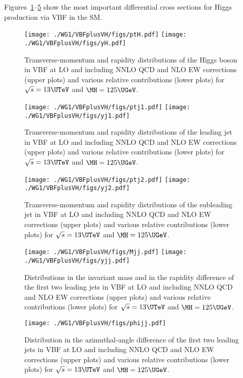 Figures~\ref{fig:SM-VBF-ptH-yH}--\ref{fig:SM-VBF-phijj} show the most important
differential cross sections for Higgs production via VBF in the SM.
%
\begin{figure}
\texttt{[image: ./WG1/VBFplusVH/figs/ptH.pdf]}
\hfill
\texttt{[image: ./WG1/VBFplusVH/figs/yH.pdf]}
\caption{Transverse-momentum and rapidity distributions of the Higgs boson in VBF
at LO and including NNLO QCD and NLO EW corrections (upper plots)
and various relative contributions (lower plots) for $\sqrt{s}=13\UTeV$ and $\MH=125\UGeV$.}
\label{fig:SM-VBF-ptH-yH}
\end{figure}
%
\begin{figure}
\texttt{[image: ./WG1/VBFplusVH/figs/ptj1.pdf]}
\hfill
\texttt{[image: ./WG1/VBFplusVH/figs/yj1.pdf]}
\caption{Transverse-momentum and rapidity distributions of the leading jet in VBF
at LO and including NNLO QCD and NLO EW corrections (upper plots)
and various relative contributions (lower plots) for $\sqrt{s}=13\UTeV$ and $\MH=125\UGeV$.}
\label{fig:SM-VBF-ptj1-yj1}
\end{figure}
%
\begin{figure}
\texttt{[image: ./WG1/VBFplusVH/figs/ptj2.pdf]}
\hfill
\texttt{[image: ./WG1/VBFplusVH/figs/yj2.pdf]}
\caption{Transverse-momentum and rapidity distributions of the subleading jet in VBF
at LO and including NNLO QCD and NLO EW corrections (upper plots)
and various relative contributions (lower plots) for $\sqrt{s}=13\UTeV$ and $\MH=125\UGeV$.}
\label{fig:SM-VBF-ptj2-yj2}
\end{figure}
%
\begin{figure}
\texttt{[image: ./WG1/VBFplusVH/figs/Mjj.pdf]}
\hfill
\texttt{[image: ./WG1/VBFplusVH/figs/yjj.pdf]}
\caption{Distributions in the invariant mass and in the rapidity difference of the first two
leading jets in VBF
at LO and including NNLO QCD and NLO EW corrections (upper plots)
and various relative contributions (lower plots) for $\sqrt{s}=13\UTeV$ and $\MH=125\UGeV$.}
\label{fig:SM-VBF-Mjj-yjj}
\end{figure}
%
\begin{figure}
\centerline{
\texttt{[image: ./WG1/VBFplusVH/figs/phijj.pdf]}
}
\caption{Distribution in the azimuthal-angle difference of the first two
leading jets in VBF
at LO and including NNLO QCD and NLO EW corrections (upper plots)
and various relative contributions (lower plots) for $\sqrt{s}=13\UTeV$ and $\MH=125\UGeV$.}
\label{fig:SM-VBF-phijj}
\end{figure}
